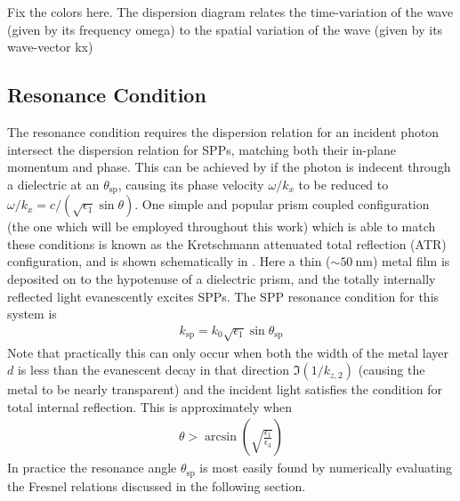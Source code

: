 Fix the colors here.
The dispersion diagram relates the time-variation of the wave (given by its
frequency omega) to the spatial variation of the wave (given by its
wave-vector kx)

\subsection{Resonance Condition}
The resonance condition requires the dispersion relation for an
incident photon intersect the dispersion relation for SPPs, matching both
their in-plane momentum and phase.  This can be achieved by if the photon
is indecent through a dielectric at an $\theta_\text{sp}$, causing its phase
velocity $\omega/k_x$ to be reduced to  $\omega/k_x = c/(\sqrt{\epsilon_1}
\sin \theta)$.  One simple and popular prism coupled configuration (the one
which will be employed throughout this work) which is able to match these
conditions is known as the Kretschmann attenuated total reflection (ATR)
configuration, and is shown schematically in .
Here a thin ($\sim \SI{50}{\nano\meter}$) metal film is deposited on to the
hypotenuse of a dielectric prism, and the totally internally reflected
light evanescently excites SPPs.  The SPP resonance condition for this
system is
\begin{align}
k_\text{sp}=k_0 \sqrt{\epsilon_1} \sin \theta_\text{sp} 
\end{align}
Note that practically this can only occur when both the width of the metal
layer $d$ is less than the evanescent decay in that direction
$\Im(1/k_{z,2})$ (causing the metal to be nearly transparent) and the
incident light satisfies the condition for total internal reflection.  This 
is approximately when
\begin{align}
\theta>\arcsin\left(\sqrt{\frac{\epsilon_1}{\epsilon_3}}\right)
\end{align} 
In practice the resonance angle $\theta_\text{sp}$ is most easily found by
numerically evaluating the Fresnel relations discussed in the following
section.


